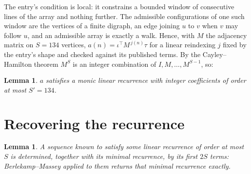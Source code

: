 \documentclass[11pt,a4paper]{article}
\theoremstyle{plain}
\newtheorem{lemma}[theorem]{Lemma}
\theoremstyle{definition}
\begin{document}
The entry's condition is local: it constrains a bounded window of consecutive lines of the
array and nothing further. The admissible configurations of one such window are the vertices
of a finite digraph, an edge joining $u$ to $v$ when $v$ may follow $u$, and an admissible
array is exactly a walk. Hence, with $M$ the adjacency matrix on $S=134$ vertices,
$a(n)=\iota^{\!\top}M^{\,j(n)}\tau$ for a linear reindexing $j$ fixed by the entry's shape
and checked against its published terms. By the Cayley--Hamilton theorem $M^{S}$ is an
integer combination of $I,M,\dots,M^{S-1}$, so:

\begin{lemma}\label{lem:cf}
$a$ satisfies a monic linear recurrence with integer coefficients of order at most
$S'=134$.
\end{lemma}

\section{Recovering the recurrence}

\begin{lemma}\label{lem:bm}
A sequence known to satisfy some linear recurrence of order at most $S$ is determined, together
with its minimal recurrence, by its first $2S$ terms: Berlekamp--Massey applied to them returns
that minimal recurrence exactly.
\end{lemma}
\end{document}

